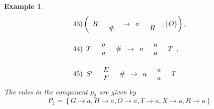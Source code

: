 \documentclass[11pt]{article}
\newtheorem{example}[theorem]{Example}
\begin{document}
\begin{example}
\[\begin{array}{l}
 43)\left( {\begin{array}{*{20}c}
   R & {\begin{array}{*{20}c}
   {}  \\
   \#   \\
\end{array}}  \\
\end{array} \to \begin{array}{*{20}c}
   a & {\begin{array}{*{20}c}
   {}  \\
   R  \\
\end{array}}  \\
\end{array},\left\{ O \right\}} \right), \\\\
 44)\begin{array}{*{20}c}
   T & {\begin{array}{*{20}c}
   a  \\
   a  \\
\end{array}} & \#   \\
\end{array} \to \begin{array}{*{20}c}
   a & {\begin{array}{*{20}c}
   a  \\
   a  \\
\end{array}} & T  \\
\end{array}, \\\\
 45)\begin{array}{*{20}c}
   {S'} & {\begin{array}{*{20}c}
   E  \\
   F  \\
\end{array}} & \#   \\
\end{array} \to \begin{array}{*{20}c}
   a & {\begin{array}{*{20}c}
   a  \\
   a  \\
\end{array}} & T  \\
\end{array} \\
 \end{array}
\]
The rules in the component $p_2$ are given by
\[
P_2  = \left\{ {G \to a,H \to a,O \to a,T \to a,X \to a,R \to a}
\right\}
\]


\end{example}
\end{document}
